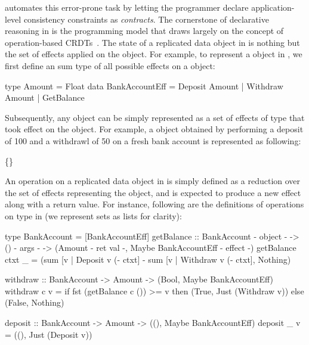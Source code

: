 \name automates this error-prone task by letting the programmer
declare application-level consistency constraints as \emph{contracts}.
The cornerstone of declarative reasoning in \name is the programming
model that draws largely on the concept of operation-based
CRDTs~\cite{shapiroCRDT}. The state of a replicated data object in
\name is nothing but the set of effects applied on the object. For
example, to represent a  object in \name, we first
define an sum type of all possible effects on a 
object:
\begin{codehaskell}
type Amount = Float
data BankAccountEff = Deposit Amount
                    | Withdraw Amount 
                    | GetBalance
\end{codehaskell}
Subsequently, any  object can be simply represented as a set of
effects of type  that took effect on the object.
For example, a  object obtained by performing a
deposit of 100 and a withdrawl of 50 on a fresh bank account is
represented as following:
\begin{center}
  \{\}
\end{center}
An operation on a replicated data object in \name is simply defined as
a reduction over the set of effects representing the object, and is
expected to produce a new effect along with a return value. For
instance, following are the definitions of operations on
 type in \name (we represent sets as lists for
clarity):
\begin{codehaskell}
type BankAccount = [BankAccountEff]
getBalance ::  BankAccount {- object -}
  -> () {- args -}
  -> (Amount {- ret val -}, 
      Maybe BankAccountEff {- effect -})
getBalance ctxt _ = (sum [v | Deposit v (- ctxt]
        - sum [v | Withdraw v (- ctxt], Nothing)

withdraw :: BankAccount -> Amount 
  -> (Bool, Maybe BankAccountEff)
withdraw c v = if fst (getBalance c ()) >= v
               then (True, Just (Withdraw v))
               else (False, Nothing)

deposit :: BankAccount -> Amount
  -> ((), Maybe BankAccountEff)
deposit _ v = ((), Just (Deposit v))
\end{codehaskell}

